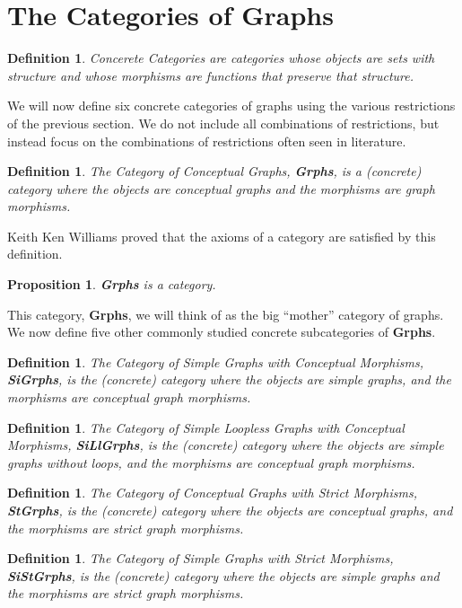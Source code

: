 \documentclass[11pt]{article}
\newtheorem{proposition}[theorem]{Proposition}
\newtheorem{definition}[theorem]{Definition}
\begin{document}
\section{The Categories of Graphs}
\begin{definition} \emph{Concerete Categories} \cite{Mac} are categories whose objects are sets with structure and whose morphisms are functions that preserve that structure.
\end{definition}
\indent We will now define six concrete categories of graphs using the various restrictions of the previous section. We do not include all combinations of restrictions, but instead focus on the combinations of restrictions often seen in literature.
\begin{definition}
The \emph{Category of Conceptual Graphs}, \textbf{Grphs}, is a (concrete) category where the objects are conceptual graphs and the morphisms are graph morphisms.
\end{definition}
\indent Keith Ken Williams \cite{KKWil} proved that the axioms of a category are satisfied by this definition. 
\begin{proposition}
\textbf{Grphs} is a category.
\end{proposition}
\indent This category, \textbf{Grphs}, we will think of as the big ``mother'' category of graphs. We now define five other commonly studied concrete subcategories of \textbf{Grphs}.
\begin{definition}
The \emph{Category of Simple Graphs with Conceptual Morphisms}, \textbf{SiGrphs}, is the (concrete) category where the objects are simple graphs, and the morphisms are conceptual graph morphisms.
\end{definition}
\begin{definition}
The \emph{Category of Simple Loopless Graphs with Conceptual Morphisms}, \textbf{SiLlGrphs}, is the (concrete) category where the objects are simple graphs without loops, and the morphisms are conceptual graph morphisms.
\end{definition}
\begin{definition}
The \emph{Category of Conceptual Graphs with Strict Morphisms}, \textbf{StGrphs}, is the (concrete) category where the objects are conceptual graphs, and the morphisms are strict graph morphisms.
\end{definition}
\begin{definition}
The \emph{Category of Simple Graphs with Strict Morphisms}, \textbf{SiStGrphs}, is the (concrete) category where the objects are simple graphs and the morphisms are strict graph morphisms.
\end{definition}
\end{document}

